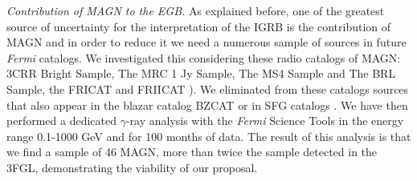 \documentclass[12 pt]{article}
\begin{document}
{\it Contribution of MAGN to the EGB.}
As explained before, one of the greatest source of uncertainty for the interpretation of the IGRB is the contribution of MAGN and in order to reduce it we need a numerous sample of sources in future {\it Fermi} catalogs.
We investigated this considering these radio catalogs of MAGN: 3CRR Bright Sample, The MRC 1 Jy Sample, The MS4 Sample and The BRL Sample, the FRICAT \cite{Capetti:2016srb} and FRIICAT \cite{Capetti:2017fjb}).
We eliminated from these catalogs sources that also appear in the blazar catalog BZCAT \cite{Massaro:2015nia} or in SFG catalogs \cite{Sanders:2003ms,2004ApJ...606..271G}. 
We have then performed a dedicated $\gamma$-ray analysis with the {\it Fermi} Science Tools in the energy range 0.1-1000 GeV and for 100 months of data. 
The result of this analysis is that we find a sample of 46 MAGN, more than twice the sample detected in the 3FGL, demonstrating the viability of our proposal.


\end{document}
